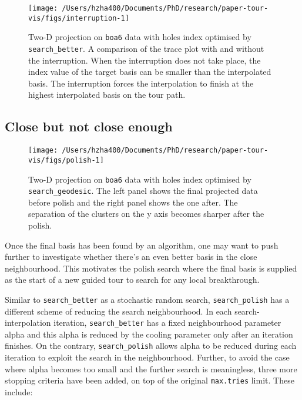 \documentclass[12pt]{article}
\begin{document}
\begin{figure}

{\centering \texttt{[image: /Users/hzha400/Documents/PhD/research/paper-tour-vis/figs/interruption-1]} 

}

\caption{Two-D projection on \texttt{boa6} data with holes index optimised by \texttt{search\_better}. A comparison of the trace plot with and without the interruption. When the interruption does not take place, the index value of the target basis can be smaller than the interpolated basis. The interruption forces the interpolation to finish at the highest interpolated basis on the tour path.}\label{fig:interruption}
\end{figure}



\hypertarget{close-but-not-close-enough}{%
\subsection{Close but not close enough}\label{close-but-not-close-enough}}

\begin{figure}

{\centering \texttt{[image: /Users/hzha400/Documents/PhD/research/paper-tour-vis/figs/polish-1]} 

}

\caption{Two-D projection on \texttt{boa6} data with holes index optimised by \texttt{search\_geodesic}. The left panel shows the final projected data before polish and the right panel shows the one after. The separation of the clusters on the y axis becomes sharper after the polish.}\label{fig:polish}
\end{figure}



Once the final basis has been found by an algorithm, one may want to push further to investigate whether there's an even better basis in the close neighbourhood. This motivates the polish search where the final basis is supplied as the start of a new guided tour to search for any local breakthrough.

Similar to \texttt{search\_better} as a stochastic random search, \texttt{search\_polish} has a different scheme of reducing the search neighbourhood. In each search-interpolation iteration, \texttt{search\_better} has a fixed neighbourhood parameter alpha and this alpha is reduced by the cooling parameter only after an iteration finishes. On the contrary, \texttt{search\_polish} allows alpha to be reduced during each iteration to exploit the search in the neighbourhood. Further, to avoid the case where alpha becomes too small and the further search is meaningless, three more stopping criteria have been added, on top of the original \texttt{max.tries} limit. These include:
\end{document}
